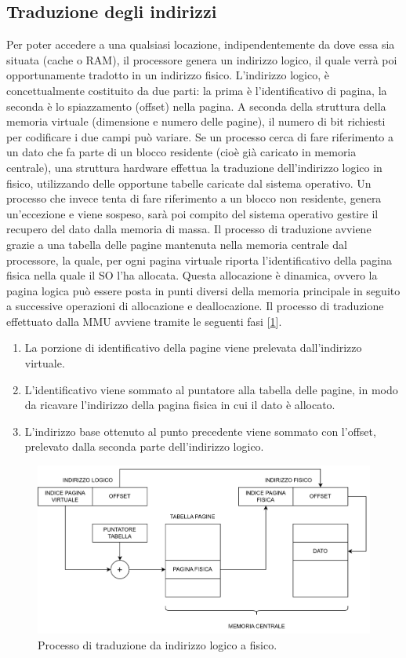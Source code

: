 \subsection{Traduzione degli indirizzi}
Per poter accedere a una qualsiasi locazione, indipendentemente da dove essa sia situata (cache o RAM), il processore genera un indirizzo logico, il quale verrà poi opportunamente tradotto in un indirizzo fisico. L'indirizzo logico, è concettualmente costituito da due parti: la prima è l'identificativo di pagina, la seconda è lo spiazzamento (offset) nella pagina. A seconda della struttura della memoria virtuale (dimensione e numero delle pagine), il numero di bit richiesti per codificare i due campi può variare. Se un processo cerca di fare riferimento a un dato che fa parte di un blocco residente (cioè già caricato in memoria centrale), una struttura hardware effettua la traduzione dell'indirizzo logico in fisico, utilizzando delle opportune tabelle caricate dal sistema operativo. Un processo che invece tenta di fare riferimento a un blocco non residente, genera un'eccezione e viene sospeso, sarà poi compito del sistema operativo gestire il recupero del dato dalla memoria di massa. Il processo di traduzione avviene grazie a una tabella delle pagine mantenuta nella memoria centrale dal processore, la quale, per ogni pagina virtuale riporta l'identificativo della pagina fisica nella quale il SO l'ha allocata. Questa allocazione è dinamica, ovvero la pagina logica può essere posta in punti diversi della memoria principale in seguito a successive operazioni di allocazione e deallocazione. Il processo di traduzione effettuato dalla MMU avviene tramite le seguenti fasi [\ref{fig:traduzione}].
\begin{enumerate}
    \item La porzione di identificativo della pagine viene prelevata dall'indirizzo virtuale.
    \item L'identificativo viene sommato al puntatore alla tabella delle pagine, in modo da ricavare l'indirizzo della pagina fisica in cui il dato è allocato.
    \item L'indirizzo base ottenuto al punto precedente viene sommato con l'offset, prelevato dalla seconda parte dell'indirizzo logico.
\end{enumerate}

\begin{figure}[!h]
    \centering
    \includegraphics[width=0.65\linewidth]{img/traduzione.png}
    \caption{Processo di traduzione da indirizzo logico a fisico.}
    \label{fig:traduzione}
\end{figure}


